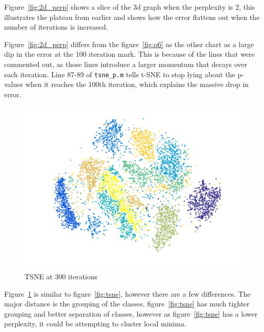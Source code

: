 Figure~\ref{fig:2d_perp} shows a slice of the 3d graph when the perplexity is 2,
this illustrates the plateau from earlier and shows how the error flattens out when the number of iterations is increased.


Figure~\ref{fig:2d_perp} differs from the figure~\ref{fig:q6} as the other chart as a large dip in the error at the 100 iteration mark.
This is because of the lines that were commented out, as those lines introduce a larger momentum that decays over each iteration. Line 87-89 of \verb|tsne_p.m| tells t-SNE to stop lying about the p-values when it reaches the 100th iteration, which explains the massive drop in error.

\begin{figure}[H]
    \includegraphics[width=\linewidth]{../../pracs/week6/images/tsne_large_perplexity}
    \centering
    \caption{TSNE at 300 iterations\label{fig:tsne2}}
\end{figure}

Figure~\ref{fig:tsne2} is similar to figure~\ref{fig:tsne}, however there are a few differences.
The major distance is the grouping of the classes, figure~\ref{fig:tsne} has much tighter grouping and better separation of classes,
however as figure~\ref{fig:tsne} has a lower perplexity, it could be attempting to cluster local minima.

